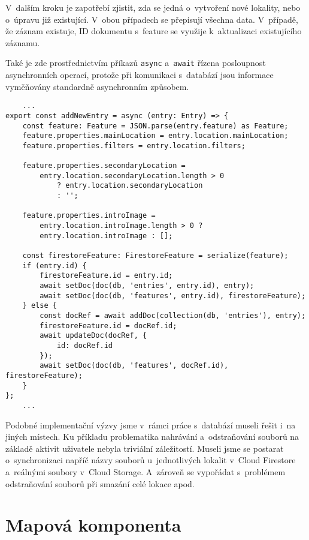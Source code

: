 V~dalším kroku je zapotřebí zjistit, zda se jedná o~vytvoření nové lokality, nebo o~úpravu již existující. V~obou případech se přepisují všechna data. V~případě, že záznam existuje, ID dokumentu s~feature se využije k~aktualizaci existujícího záznamu.

Také je zde prostřednictvím příkazů \verb|async| a~\verb|await| řízena posloupnost asynchronních operací, protože při komunikaci s~databází jsou informace vyměňovány standardně asynchronním způsobem.

\begin{verbatim}
    ...
export const addNewEntry = async (entry: Entry) => {
    const feature: Feature = JSON.parse(entry.feature) as Feature;
    feature.properties.mainLocation = entry.location.mainLocation;
    feature.properties.filters = entry.location.filters;

    feature.properties.secondaryLocation =
        entry.location.secondaryLocation.length > 0
            ? entry.location.secondaryLocation
            : '';

    feature.properties.introImage =
        entry.location.introImage.length > 0 ? 
        entry.location.introImage : [];

    const firestoreFeature: FirestoreFeature = serialize(feature);
    if (entry.id) {
        firestoreFeature.id = entry.id;
        await setDoc(doc(db, 'entries', entry.id), entry);
        await setDoc(doc(db, 'features', entry.id), firestoreFeature);
    } else {
        const docRef = await addDoc(collection(db, 'entries'), entry);
        firestoreFeature.id = docRef.id;
        await updateDoc(docRef, {
            id: docRef.id
        });
        await setDoc(doc(db, 'features', docRef.id), firestoreFeature);
    }
};
    ...
    \end{verbatim}

Podobné implementační výzvy jsme v~rámci práce s~databází museli řešit i~na jiných místech. Ku příkladu problematika nahrávání a~odstraňování souborů na základě aktivit uživatele nebyla triviální záležitostí. Museli jsme se postarat o~synchronizaci napříč názvy souborů u~jednotlivých lokalit v~Cloud Firestore a~reálnými soubory v~Cloud Storage. A~zároveň se vypořádat s~problémem odstraňování souborů při smazání celé lokace apod.

\hypertarget{mapovuxe1-komponenta}{%
\section{Mapová komponenta}\label{mapovuxe1-komponenta}}

